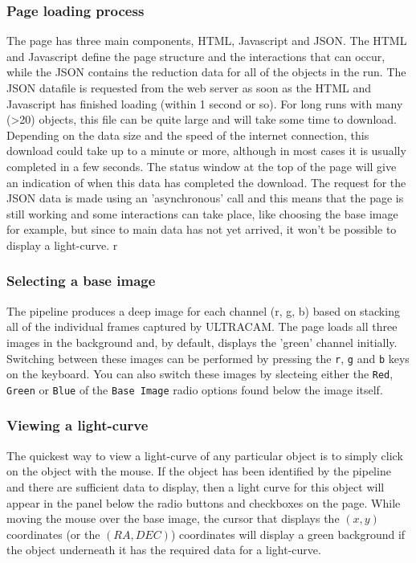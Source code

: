 \subsubsection{Page loading process}
The page has three main components, HTML, Javascript and JSON. The HTML and Javascript define the page structure and the interactions that can occur, while the JSON contains the reduction data for all of the objects in the run. The JSON datafile is requested from the web server as soon as the HTML and Javascript has finished loading (within 1 second or so). For long runs with many (\textgreater 20) objects, this file can be quite large and will take some time to download. Depending on the data size and the speed of the internet connection, this download could take up to a minute or more, although in most cases it is usually completed in a few seconds. The status window at the top of the page will give an indication of when this data has completed the download. The request for the JSON data is made using an 'asynchronous' call and this means that the page is still working and some interactions can take place, like choosing the base image for example, but since to main data has not yet arrived, it won't be possible to display a light-curve.  
r
\subsubsection{Selecting a base image}
The pipeline produces a deep image for each channel (r, g, b) based on stacking all of the individual frames captured by ULTRACAM. The page loads all three images in the background and, by default, displays the 'green' channel initially. Switching between these images can be performed by pressing the \texttt{r}, \texttt{g} and \texttt{b} keys on the keyboard. You can also switch these images by slecteing either the \texttt{Red},  \texttt{Green} or \texttt{Blue} of the \texttt{Base Image} radio options found below the image itself.

\subsubsection{Viewing a light-curve}
The quickest way to view a light-curve of any particular object is to simply click on the object with the mouse. If the object has been identified by the pipeline and there are sufficient data to display, then a light curve for this object will appear in the panel below the radio buttons and checkboxes on the page. While moving the mouse over the base image, the cursor that displays the $(x, y)$ coordinates (or the $(RA, DEC)$) coordinates will display a green background if the object underneath it has the required data for a light-curve.

